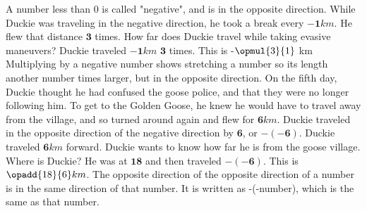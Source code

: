 {A number less than 0 is called "negative", and is in the opposite direction. }
{}
{While Duckie was traveling in the negative direction, he took a break every $\mathbf{-1} km$. He flew that distance  $\mathbf{3}$ times. How far does Duckie travel while taking evasive maneuvers?}
{Duckie traveled $\mathbf{-1} km$ $\mathbf{3}$ times. This is -$\opmul{3}{1}$ km}
{Multiplying by a negative number shows stretching a number so its length another number times larger, but in the opposite direction. }
{}
{On the fifth day, Duckie thought he had confused the goose police, and that they were no longer following him. To get to the Golden Goose, he knew he would have to travel away from the village, and so turned around again and flew for $\mathbf{6} km$. Duckie traveled in the opposite direction of the negative direction by $\mathbf{6}$, or $\mathbf{-(-6)}$. Duckie traveled $\mathbf{6} km$ forward. Duckie wants to know how far he is from the goose village. Where is Duckie?}
{He was at $\mathbf{18}$ and then traveled $\mathbf{-(-6)}$. This is $\opadd{18}{6} km$.}
{The opposite direction of the opposite direction of a number is in the same direction of that number. It is written as -(-number), which is the same as that number.}
{}
